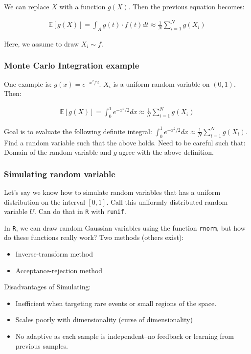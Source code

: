 We can replace $X$ with a function $g(X)$. Then the previous equation becomes:

\begin{align*}
    \mathbb{E}[g(X)] = \int_A g(t)\cdot f(t)dt\approx \frac{1}{N}\sum_{i=1}^N g(X_i)
\end{align*}

Here, we assume to draw $X_i \sim f$.

\subsubsection{Monte Carlo Integration example}

\indent 

One example is: $g(x) = e^{-x^2/2}$. $X_i$ is a uniform random variable on $(0,1)$. Then:

\begin{align*}
    \mathbb{E}[g(X)] = \int_0^1 e^{-x^2/2}dx\approx \frac{1}{N}\sum_{i=1}^N g(X_i)
\end{align*}

Goal is to evaluate the following definite integral: $\int_0^1 e^{-x^2/2}dx\approx \frac{1}{N}\sum_{i=1}^N g(X_i)$. Find a random variable such that the above holds. Need to be careful such that: Domain of the random variable and $g$ agree with the above definition.

\subsubsection{Simulating random variable}

\indent 

Let’s say we know how to simulate random variables that has a uniform distribution on the interval $[0,1]$. Call this uniformly distributed random variable $U$. Can do that in \texttt{R} with \texttt{runif}.

In \texttt{R}, we can draw random Gaussian variables using the function \texttt{rnorm}, but how do these functions really work? Two methods (others exist):

\begin{itemize}
    \item Inverse-transform method
    \item Acceptance-rejection method
\end{itemize}

Disadvantages of Simulating:

\begin{itemize}
    \item Inefficient when targeting rare events or small regions of the space.
    \item Scales poorly with dimensionality (curse of dimensionality)
    \item No adaptive as each sample is independent–no feedback or learning from previous samples.
\end{itemize}

